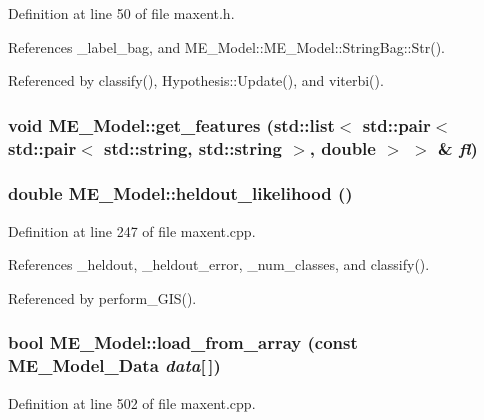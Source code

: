 Definition at line 50 of file maxent.h.

References \_\-label\_\-bag, and ME\_\-Model::ME\_\-Model::StringBag::Str().

Referenced by classify(), Hypothesis::Update(), and viterbi().\hypertarget{classME__Model_bd1372fb000a4fdc8ef9b560a0c8b4c3}{
\subsubsection[{get\_\-features}]{\setlength{\rightskip}{0pt plus 5cm}void ME\_\-Model::get\_\-features (std::list$<$ std::pair$<$ std::pair$<$ std::string, std::string $>$, double $>$ $>$ \& {\em fl})}}
\label{classME__Model_bd1372fb000a4fdc8ef9b560a0c8b4c3}


\hypertarget{classME__Model_39490060a9aa91c5bfef26db89995d81}{
\subsubsection[{heldout\_\-likelihood}]{\setlength{\rightskip}{0pt plus 5cm}double ME\_\-Model::heldout\_\-likelihood ()}}
\label{classME__Model_39490060a9aa91c5bfef26db89995d81}




Definition at line 247 of file maxent.cpp.

References \_\-heldout, \_\-heldout\_\-error, \_\-num\_\-classes, and classify().

Referenced by perform\_\-GIS().\hypertarget{classME__Model_9c920643190ccbec467e4e9cf916c4b8}{
\subsubsection[{load\_\-from\_\-array}]{\setlength{\rightskip}{0pt plus 5cm}bool ME\_\-Model::load\_\-from\_\-array (const {\bf ME\_\-Model\_\-Data} {\em data}\mbox{[}$\,$\mbox{]})}}
\label{classME__Model_9c920643190ccbec467e4e9cf916c4b8}




Definition at line 502 of file maxent.cpp.

